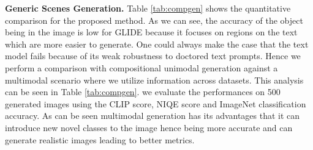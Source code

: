 \documentclass[10pt,twocolumn,letterpaper]{article}
\begin{document}
\begin{table}[t]
\caption{\textbf{Comparison for generic scenes creation.} Here we consider three different reliability values $\{0,0.5,1\}$ and report the best possible value.Acc denotes ImageNet classification  accuracy}
\label{tab:compgen}
\vspace{-3mm}
\end{table}
 
 \noindent\textbf{Generic Scenes Generation.} Table \ref{tab:compgen} shows the quantitative comparison for the proposed method. As we can see, the accuracy of the object being in the image is low for GLIDE \cite{nichol2021glide}  because it focuses on regions on the text which are more easier to generate.  One could always make the case that the text model fails because of its weak robustness to doctored text prompts. Hence we perform a comparison with compositional unimodal generation \cite{liu2022compositional}  against a multimodal scenario where we utilize information across datasets. This analysis can be seen in Table \ref{tab:compgen}. we evaluate the performances on 500 generated images using the CLIP score, NIQE score and ImageNet classification accuracy. As can be seen multimodal generation has its advantages that it can introduce new novel classes to the image hence being more accurate and can generate realistic images leading to better metrics.
\end{document}
